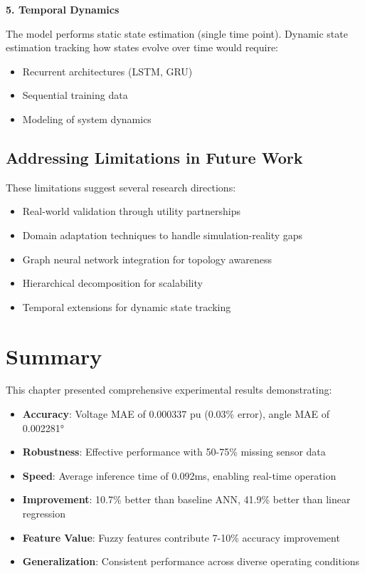\documentclass[12pt,a4paper]{report}
\begin{document}
\textbf{5. Temporal Dynamics}

The model performs static state estimation (single time point). Dynamic state estimation tracking how states evolve over time would require:
\begin{itemize}
    \item Recurrent architectures (LSTM, GRU)
    \item Sequential training data
    \item Modeling of system dynamics
\end{itemize}

\subsection{Addressing Limitations in Future Work}

These limitations suggest several research directions:

\begin{itemize}
    \item Real-world validation through utility partnerships
    \item Domain adaptation techniques to handle simulation-reality gaps
    \item Graph neural network integration for topology awareness
    \item Hierarchical decomposition for scalability
    \item Temporal extensions for dynamic state tracking
\end{itemize}

\section{Summary}

This chapter presented comprehensive experimental results demonstrating:

\begin{itemize}
    \item \textbf{Accuracy}: Voltage MAE of 0.000337 pu (0.03\% error), angle MAE of 0.002281°
    \item \textbf{Robustness}: Effective performance with 50-75\% missing sensor data
    \item \textbf{Speed}: Average inference time of 0.092ms, enabling real-time operation
    \item \textbf{Improvement}: 10.7\% better than baseline ANN, 41.9\% better than linear regression
    \item \textbf{Feature Value}: Fuzzy features contribute 7-10\% accuracy improvement
    \item \textbf{Generalization}: Consistent performance across diverse operating conditions
\end{itemize}
\end{document}
